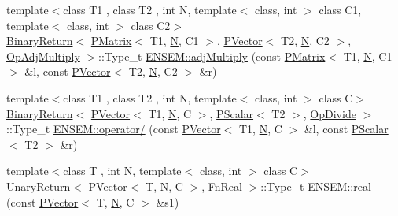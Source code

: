 \begin{DoxyCompactItemize}
\item 
{\footnotesize template$<$class T1 , class T2 , int N, template$<$ class, int $>$ class C1, template$<$ class, int $>$ class C2$>$ }\\\mbox{\hyperlink{structENSEM_1_1BinaryReturn}{Binary\+Return}}$<$ \mbox{\hyperlink{classENSEM_1_1PMatrix}{P\+Matrix}}$<$ T1, \mbox{\hyperlink{operator__name__util_8cc_a7722c8ecbb62d99aee7ce68b1752f337}{N}}, C1 $>$, \mbox{\hyperlink{classENSEM_1_1PVector}{P\+Vector}}$<$ T2, \mbox{\hyperlink{operator__name__util_8cc_a7722c8ecbb62d99aee7ce68b1752f337}{N}}, C2 $>$, \mbox{\hyperlink{structENSEM_1_1OpAdjMultiply}{Op\+Adj\+Multiply}} $>$\+::Type\+\_\+t \mbox{\hyperlink{group__primvector_ga1728ca784073c199bee500323e8ae96e}{E\+N\+S\+E\+M\+::adj\+Multiply}} (const \mbox{\hyperlink{classENSEM_1_1PMatrix}{P\+Matrix}}$<$ T1, \mbox{\hyperlink{operator__name__util_8cc_a7722c8ecbb62d99aee7ce68b1752f337}{N}}, C1 $>$ \&l, const \mbox{\hyperlink{classENSEM_1_1PVector}{P\+Vector}}$<$ T2, \mbox{\hyperlink{operator__name__util_8cc_a7722c8ecbb62d99aee7ce68b1752f337}{N}}, C2 $>$ \&r)
\item 
{\footnotesize template$<$class T1 , class T2 , int N, template$<$ class, int $>$ class C$>$ }\\\mbox{\hyperlink{structENSEM_1_1BinaryReturn}{Binary\+Return}}$<$ \mbox{\hyperlink{classENSEM_1_1PVector}{P\+Vector}}$<$ T1, \mbox{\hyperlink{operator__name__util_8cc_a7722c8ecbb62d99aee7ce68b1752f337}{N}}, C $>$, \mbox{\hyperlink{classENSEM_1_1PScalar}{P\+Scalar}}$<$ T2 $>$, \mbox{\hyperlink{structENSEM_1_1OpDivide}{Op\+Divide}} $>$\+::Type\+\_\+t \mbox{\hyperlink{group__primvector_gac0d72c4d06047ab6be5503cc1b557a16}{E\+N\+S\+E\+M\+::operator/}} (const \mbox{\hyperlink{classENSEM_1_1PVector}{P\+Vector}}$<$ T1, \mbox{\hyperlink{operator__name__util_8cc_a7722c8ecbb62d99aee7ce68b1752f337}{N}}, C $>$ \&l, const \mbox{\hyperlink{classENSEM_1_1PScalar}{P\+Scalar}}$<$ T2 $>$ \&r)
\item 
{\footnotesize template$<$class T , int N, template$<$ class, int $>$ class C$>$ }\\\mbox{\hyperlink{structENSEM_1_1UnaryReturn}{Unary\+Return}}$<$ \mbox{\hyperlink{classENSEM_1_1PVector}{P\+Vector}}$<$ T, \mbox{\hyperlink{operator__name__util_8cc_a7722c8ecbb62d99aee7ce68b1752f337}{N}}, C $>$, \mbox{\hyperlink{structENSEM_1_1FnReal}{Fn\+Real}} $>$\+::Type\+\_\+t \mbox{\hyperlink{group__primvector_ga9198795b4cc43e6d68f0273dd10b3aa1}{E\+N\+S\+E\+M\+::real}} (const \mbox{\hyperlink{classENSEM_1_1PVector}{P\+Vector}}$<$ T, \mbox{\hyperlink{operator__name__util_8cc_a7722c8ecbb62d99aee7ce68b1752f337}{N}}, C $>$ \&s1)

\end{DoxyCompactItemize}
